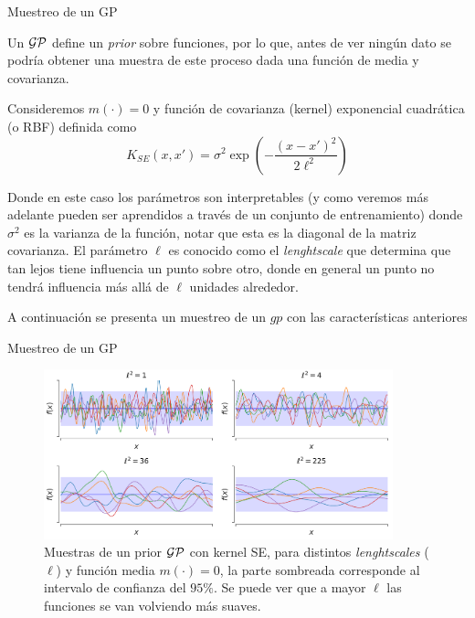 \documentclass[handout, 9pt]{beamer}
\begin{document}
\begin{frame}{Muestreo de un GP}

Un $\mathcal{GP}$ define un \textit{prior} sobre funciones, por lo que, antes de ver ningún dato se podría obtener una muestra de este proceso dada una función de media y covarianza. \pause

\vspace{0.2cm}

Consideremos $m(\cdot) = 0$ y función de covarianza (kernel) exponencial cuadrática (o RBF) definida como \pause
\begin{equation*}
  K_{SE}(x, x') = \sigma^2 \exp\left( - \frac{\left( x- x'\right)^2}{2\ell^2} \right)
\end{equation*} \pause

Donde en este caso los parámetros son interpretables (y como veremos más adelante pueden ser aprendidos a través de un conjunto de entrenamiento) donde $\sigma^2$ es la varianza de la función, notar que esta es la diagonal de la matriz covarianza. El parámetro $\ell$ es conocido como el \textit{lenghtscale} que determina que tan lejos tiene influencia un punto sobre otro, donde en general un punto no tendrá influencia más allá de $\ell$ unidades alrededor.

\vspace{0.2cm}

A continuación se presenta un muestreo de un $gp$ con las características anteriores


\end{frame}

\begin{frame}{Muestreo de un GP}

\begin{figure}[H]
  \centering
  \includegraphics[width=0.9\textwidth]{../img/cap8_prior_muestras}
  \caption{Muestras de un prior $\mathcal{GP}$ con kernel SE, para distintos \textit{lenghtscales} ($\ell$) y función media $m(\cdot)=0$, la parte sombreada corresponde al intervalo de confianza del $95\%$. Se puede ver que a mayor $\ell$ las funciones se van volviendo más suaves.}
  \label{fig:gp_1}
\end{figure}


\end{frame}
\end{document}
